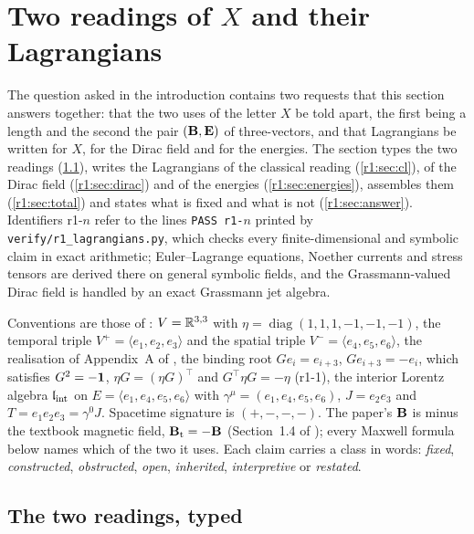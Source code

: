 \section{Two readings of \texorpdfstring{$X$}{X} and their Lagrangians}
\label{r1:sec:main}

The question asked in the introduction contains two requests that this section answers together: that the two uses of the letter $X$
be told apart, the first being a length and the second the pair $(\mathbf B,\mathbf E)$ of three-vectors, and that Lagrangians be written for $X$, for the Dirac field
and for the energies. The section types the two readings (\cref{r1:sec:types}), writes the Lagrangians of the classical reading
(\cref{r1:sec:cl}), of the Dirac field (\cref{r1:sec:dirac}) and of the energies (\cref{r1:sec:energies}), assembles them
(\cref{r1:sec:total}) and states what is fixed and what is not (\cref{r1:sec:answer}). Identifiers r1-$n$ refer to the lines
\texttt{PASS r1-$n$} printed by \texttt{verify/r1\_lagrangians.py}, which checks every finite-dimensional and symbolic claim in exact
arithmetic; Euler--Lagrange equations, Noether currents and stress tensors are derived there on general symbolic fields, and the
Grassmann-valued Dirac field is handled by an exact Grassmann jet algebra.

Conventions are those of \cite{ES17}: $V=\mathbb{R}^{3,3}$ with $\eta=\operatorname{diag}(1,1,1,-1,-1,-1)$, the temporal triple
$V^+=\langle e_1,e_2,e_3\rangle$ and the spatial triple $V^-=\langle e_4,e_5,e_6\rangle$, the realisation of Appendix~A of \cite{ES17},
the binding root $Ge_i=e_{i+3}$, $Ge_{i+3}=-e_i$, which satisfies $G^2=-\mathbf 1$, $\eta G=(\eta G)^{\!\top}$ and $G^{\!\top}\eta G=-\eta$
(r1-1), the interior Lorentz algebra $\mathfrak l_{\rm int}$ on $E=\langle e_1,e_4,e_5,e_6\rangle$ with $\gamma^\mu=(e_1,e_4,e_5,e_6)$, $J=e_2e_3$ and
$T=e_1e_2e_3=\gamma^0J$. Spacetime signature is $(+,-,-,-)$. The paper's $\mathbf B$ is minus the textbook magnetic field,
$\mathbf B_{\rm t}=-\mathbf B$ (Section~1.4 of \cite{ES17}); every Maxwell formula below names which of the two it uses. Each claim carries a class in
words: \emph{fixed}, \emph{constructed}, \emph{obstructed}, \emph{open}, \emph{inherited}, \emph{interpretive} or \emph{restated}.

\subsection{The two readings, typed}
\label{r1:sec:types}


